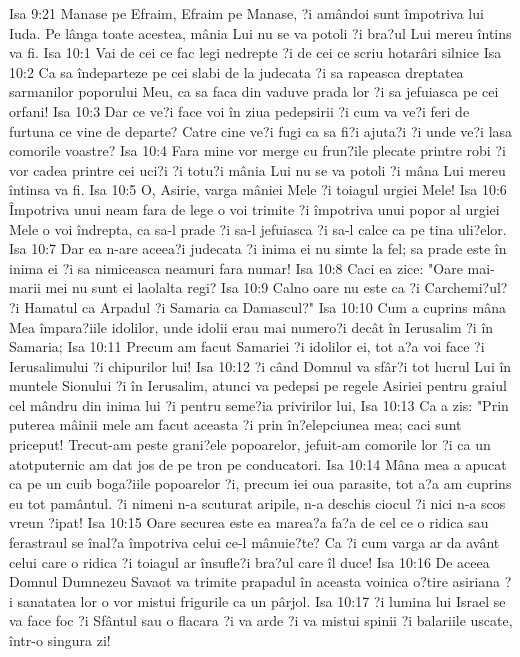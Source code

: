 Isa 9:21  Manase pe Efraim, Efraim pe Manase, ?i amândoi sunt împotriva lui Iuda. Pe lânga toate acestea, mânia Lui nu se va potoli ?i bra?ul Lui mereu întins va fi.
Isa 10:1  Vai de cei ce fac legi nedrepte ?i de cei ce scriu hotarâri silnice
Isa 10:2  Ca sa îndeparteze pe cei slabi de la judecata ?i sa rapeasca dreptatea sarmanilor poporului Meu, ca sa faca din vaduve prada lor ?i sa jefuiasca pe cei orfani!
Isa 10:3  Dar ce ve?i face voi în ziua pedepsirii ?i cum va ve?i feri de furtuna ce vine de departe? Catre cine ve?i fugi ca sa fi?i ajuta?i ?i unde ve?i lasa comorile voastre?
Isa 10:4  Fara mine vor merge cu frun?ile plecate printre robi ?i vor cadea printre cei uci?i ?i totu?i mânia Lui nu se va potoli ?i mâna Lui mereu întinsa va fi.
Isa 10:5  O, Asirie, varga mâniei Mele ?i toiagul urgiei Mele!
Isa 10:6  Împotriva unui neam fara de lege o voi trimite ?i împotriva unui popor al urgiei Mele o voi îndrepta, ca sa-l prade ?i sa-l jefuiasca ?i sa-l calce ca pe tina uli?elor.
Isa 10:7  Dar ea n-are aceea?i judecata ?i inima ei nu simte la fel; sa prade este în inima ei ?i sa nimiceasca neamuri fara numar!
Isa 10:8  Caci ea zice: "Oare mai-marii mei nu sunt ei laolalta regi?
Isa 10:9  Calno oare nu este ca ?i Carchemi?ul? ?i Hamatul ca Arpadul ?i Samaria ca Damascul?"
Isa 10:10  Cum a cuprins mâna Mea împara?iile idolilor, unde idolii erau mai numero?i decât în Ierusalim ?i în Samaria;
Isa 10:11  Precum am facut Samariei ?i idolilor ei, tot a?a voi face ?i Ierusalimului ?i chipurilor lui!
Isa 10:12  ?i când Domnul va sfâr?i tot lucrul Lui în muntele Sionului ?i în Ierusalim, atunci va pedepsi pe regele Asiriei pentru graiul cel mândru din inima lui ?i pentru seme?ia privirilor lui,
Isa 10:13  Ca a zis: "Prin puterea mâinii mele am facut aceasta ?i prin în?elepciunea mea; caci sunt priceput! Trecut-am peste grani?ele popoarelor, jefuit-am comorile lor ?i ca un atotputernic am dat jos de pe tron pe conducatori.
Isa 10:14  Mâna mea a apucat ca pe un cuib boga?iile popoarelor ?i, precum iei oua parasite, tot a?a am cuprins eu tot pamântul. ?i nimeni n-a scuturat aripile, n-a deschis ciocul ?i nici n-a scos vreun ?ipat!
Isa 10:15  Oare securea este ea marea?a fa?a de cel ce o ridica sau ferastraul se înal?a împotriva celui ce-l mânuie?te? Ca ?i cum varga ar da avânt celui care o ridica ?i toiagul ar însufle?i bra?ul care îl duce!
Isa 10:16  De aceea Domnul Dumnezeu Savaot va trimite prapadul în aceasta voinica o?tire asiriana ?i sanatatea lor o vor mistui frigurile ca un pârjol.
Isa 10:17  ?i lumina lui Israel se va face foc ?i Sfântul sau o flacara ?i va arde ?i va mistui spinii ?i balariile uscate, într-o singura zi!
